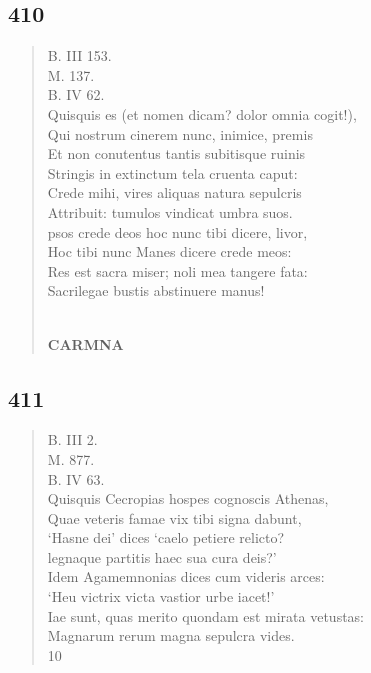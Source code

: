 \documentclass[11pt, a4paper]{report}
\begin{document}
            \subsection*{410}
      \begin{verse}
      B. III 153. \\ M. 137. \\ B. IV 62. \\ Quisquis es (et nomen dicam? dolor omnia cogit!), \\ Qui nostrum cinerem nunc, inimice, premis \\ Et non conutentus tantis subitisque ruinis \\ Stringis in extinctum tela cruenta caput: \\ Crede mihi, vires aliquas natura sepulcris \\ Attribuit: tumulos vindicat umbra suos. \\ psos crede deos hoc nunc tibi dicere, livor, \\ Hoc tibi nunc Manes dicere crede meos: \\ Res est sacra miser; noli mea tangere fata: \\ Sacrilegae bustis abstinuere manus! \\ 
        ﻿\pagebreak 
    \begin{center} \textbf{CARMNA} \end{center} \marginpar{[318]} 
      \end{verse}
  
            \subsection*{411}
      \begin{verse}
      B. III 2. \\ M. 877. \\ B. IV 63. \\ Quisquis Cecropias hospes cognoscis Athenas, \\ Quae veteris famae vix tibi signa dabunt, \\ ‘Hasne dei’ dices ‘caelo petiere relicto? \\ legnaque partitis haec sua cura deis?’ \\ Idem Agamemnonias dices cum videris arces: \\ ‘Heu victrix victa vastior urbe iacet!’ \\ Iae sunt, quas merito quondam est mirata vetustas: \\ Magnarum rerum magna sepulcra vides. \\ 10 \\ 
      \end{verse}
  
\end{document}
